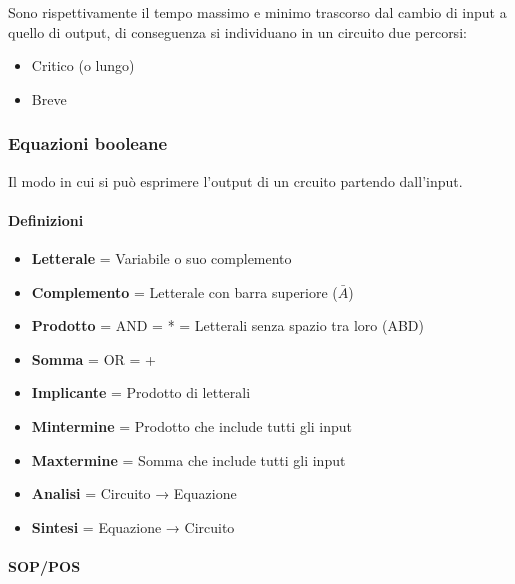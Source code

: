 \documentclass{article}
\begin{document}
Sono rispettivamente il tempo massimo e minimo trascorso dal cambio di input a quello di output, di conseguenza si individuano in un circuito due percorsi:
\begin{itemize}
    \item Critico (o lungo)
    \item Breve
\end{itemize}

\subsubsection{Equazioni booleane}

Il modo in cui si può esprimere l'output di un crcuito partendo dall'input.

\paragraph{Definizioni}

\begin{itemize}
    \item \textbf{Letterale} = Variabile o suo complemento
    \item \textbf{Complemento} = Letterale con barra superiore ($\bar{A}$)
    \item \textbf{Prodotto} = AND = * = Letterali senza spazio tra loro (ABD)
    \item \textbf{Somma} = OR = +
    \item \textbf{Implicante} = Prodotto di letterali
    \item \textbf{Mintermine} = Prodotto che include tutti gli input
    \item \textbf{Maxtermine} = Somma che include tutti gli input
    \item \textbf{Analisi} = Circuito → Equazione
    \item \textbf{Sintesi} = Equazione → Circuito
\end{itemize}

\paragraph{SOP/POS}
\end{document}

